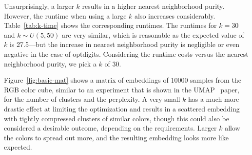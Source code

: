 Unsurprisingly, a larger $k$ results in a higher nearest neighborhood purity.
However, the runtime when using a large $k$ also increases considerably.
Table~\ref{tab:k-time} shows the corresponding runtimes. The runtimes for $k =
30$ and $k \sim U(5, 50)$ are very similar, which is reasonable as the
expected value of $k$ is 27.5---but the increase in nearest neighborhood purity
is negligible or even negative in the case of optdigits.  Considering the runtime
costs versus the nearest neighborhood purity, we pick a $k$ of 30.

Figure~\ref{fig:basic-mat} shows a matrix of embeddings of \num{10000} samples
from the RGB color cube, similar to an experiment that is shown in the
UMAP~\cite{umap} paper, for the number of clusters and the perplexity. A very
small $k$ has a much more drastic effect at limiting the optimization and
results in a scattered embedding with tightly compressed clusters of similar
colors, though this could also be considered a desirable outcome, depending on
the requirements. Larger $k$ allow the colors to spread out more, and the resulting
embedding looks more like expected.

